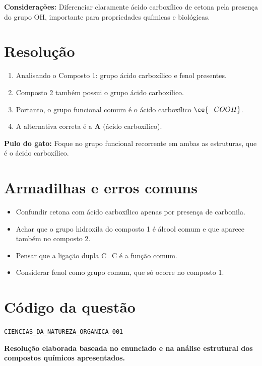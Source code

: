 \documentclass{article}
\begin{document}
\par
\textbf{Considerações:} Diferenciar claramente ácido carboxílico de cetona pela presença do grupo OH, importante para propriedades químicas e biológicas.

\section*{Resolução}

\begin{enumerate}
  \item Analisando o Composto 1: grupo ácido carboxílico e fenol presentes.
  \item Composto 2 também possui o grupo ácido carboxílico.
  \item Portanto, o grupo funcional comum é o ácido carboxílico \( \ce{-COOH} \).
  \item A alternativa correta é a \textbf{A} (ácido carboxílico).
\end{enumerate}

\textbf{Pulo do gato:} Foque no grupo funcional recorrente em ambas as estruturas, que é o ácido carboxílico.

\section*{Armadilhas e erros comuns}

\begin{itemize}
  \item Confundir cetona com ácido carboxílico apenas por presença de carbonila.
  \item Achar que o grupo hidroxila do composto 1 é álcool comum e que aparece também no composto 2.
  \item Pensar que a ligação dupla C=C é a função comum.
  \item Considerar fenol como grupo comum, que só ocorre no composto 1.
\end{itemize}

\section*{Código da questão}

\texttt{CIENCIAS\_DA\_NATUREZA\_ORGANICA\_001}

\bigskip

\textbf{\large Resolução elaborada baseada no enunciado e na análise estrutural dos compostos químicos apresentados.}
\end{document}
